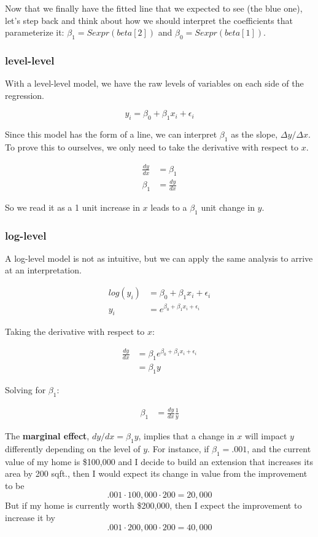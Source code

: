 \documentclass[10pt]{article}\usepackage[]{graphicx}\usepackage[]{color}
\begin{document}
Now that we finally have the fitted line that we expected to see (the blue one), let's step back and think about how we should interpret the coefficients that parameterize it: $\beta_1 = Sexpr(beta[2])$ and $\beta_0 = Sexpr(beta[1])$.

\subsubsection*{level-level}

With a level-level model, we have the raw levels of variables on each side of the regression.

$$ y_i = \beta_0 + \beta_1 x_i + \epsilon_i $$

Since this model has the form of a line, we can interpret $\beta_1$ as the slope, $\Delta y / \Delta x$. To prove this to ourselves, we only need to take the derivative with respect to $x$.

\begin{align}
\frac{dy}{dx} &=\beta_1 \\
\beta_1 &= \frac{dy}{dx}
\end{align}

So we read it as a 1 unit increase in $x$ leads to a $\beta_1$ unit change in $y$.

\subsubsection*{log-level}

A log-level model is not as intuitive, but we can apply the same analysis to arrive at an interpretation.

\begin{align}
log(y_i) &=  \beta_0 + \beta_1 x_i + \epsilon_i \\
y_i &= e^{\beta_0 + \beta_1 x_i + \epsilon_i}
\end{align}

Taking the derivative with respect to $x$:

\begin{align}
\frac{dy}{dx} &= \beta_1 e^{\beta_0 + \beta_1 x_i + \epsilon_i} \\
 &= \beta_1 y 
\end{align}

Solving for $\beta_1$:

\begin{align}
 \beta_1 &= \frac{dy}{dx} \frac{1}{y}
\end{align}

The \textbf{marginal effect}, $dy / dx = \beta_1 y$, implies that a change in $x$ will impact $y$ differently depending on the level of $y$. For instance, if $\beta_1 = .001$, and the current value of my home is \$100,000 and I decide to build an extension that increases its area by 200 sqft., then I would expect its change in value from the improvement to be $$.001 \cdot 100,000 \cdot 200 = 20,000$$ But if my home is currently worth \$200,000, then I expect the improvement to increase it by $$.001 \cdot 200,000 \cdot 200 = 40,000$$
\end{document}
